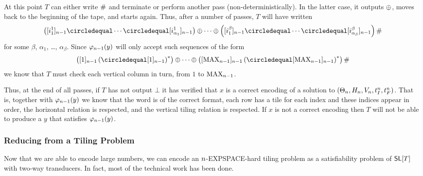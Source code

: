 \begin{itemize}
    At this point $T$ can either write $\#$ and terminate or perform another pass (non-deterministically).
    In the latter case, it outputs $\oplus$, moves back to the beginning of the tape, and starts again.
    Thus, after a number of passes, $T$ will have written
    \[
        \brac{
            \tenc{\expheight-1}{i^1_1}
            \numeq
            \cdots
            \numeq
            \tenc{\expheight-1}{i^1_{\alpha_1}}
        }
        \numplus
        \cdots
        \numplus
        \brac{
            \tenc{\expheight-1}{i^\beta_1}
            \numeq
            \cdots
            \numeq
            \tenc{\expheight-1}{i^\beta_{\alpha_\beta}}
        }
        \numsep
    \]
    for some $\beta$, $\alpha_1$, \ldots, $\alpha_\beta$.
    Since
    ${\varphi_{n-1}}\mathord{\left( y \right)}$
    will only accept such sequences of the form
    \[
        \brac{
            \tenc{\expheight-1}{1}
            \brac{
                \numeq \tenc{\expheight-1}{1}
            }^\ast
        }
        \numplus
        \cdots
        \numplus
        \brac{
            \tenc{\expheight-1}{\nmax{\expheight-1}}
            \brac{
                \numeq \tenc{\expheight-1}{\nmax{\expheight-1}}
            }^\ast
        }
        \numsep
    \]
    we know that $T$ must check each vertical column in turn, from $1$ to
    $\text{MAX}_{n-1}$.
\end{itemize}

Thus, at the end of all passes, if $T$ has not output $\bot$ it has verified that $x$ is a correct encoding of a solution to
$\left( \Theta_{n},
      H_{n},
      V_{n},
      t_I^{n},
      t_F^{n} \right)$.
That is, together with
${\varphi_{n-1}}\mathord{\left( y \right)}$
we know that
    the word is of the correct format,
    each row has a tile for each index and these indices appear in order,
    the horizontal relation is respected, and
    the vertical tiling relation is respected.
If $x$ is not a correct encoding then $T$ will not be able to produce a $y$ that satisfies
${\varphi_{n-1}}\mathord{\left( y \right)}$.


\subsubsection{Reducing from a Tiling Problem}

Now that we are able to encode large numbers, we can encode an $n$-EXPSPACE-hard tiling problem as a satisfiability problem of $\mathsf{SL}[T]$ with two-way transducers.
In fact, most of the technical work has been done.

